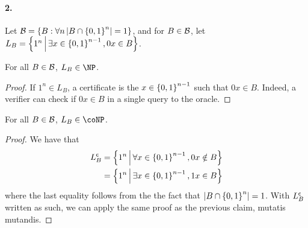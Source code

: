     \paragraph{2.}
    Let $ \mathcal B = \left\{ B : \forall n \left| B \cap \left\{ 0, 1 \right\}^n \right| = 1 \right\} $,
    and for $B \in \mathcal B$, let $
        L_B = \left\{ 1^n \, \middle| \,  \exists x \in \left\{ 0, 1 \right\}^{n-1}, 0x \in B \right\}
    $.

    \begin{claim}
        For all $B \in \mathcal B$, $L_B \in \NP$.
    \end{claim}
    \begin{proof}
        If $1^n \in L_B$, a certificate is the $x \in \left\{ 0, 1 \right\}^{n-1}$
        such that $0x \in B$. Indeed, a verifier can check if $0x \in B$ in a 
        single query to the oracle.
    \end{proof}


    \begin{claim}
        For all $B \in \mathcal B$, $L_B \in \coNP$.
    \end{claim}
    \begin{proof}
        We have that \begin{align*}
            L_B^\mathsf{c} &=
            \left\{ 1^n \, \middle| \,  
                \forall x \in \left\{ 0, 1 \right\}^{n-1}, 0x \notin B
             \right\}
            \\&=
            \left\{ 1^n \, \middle| \,  
                \exists x \in \left\{ 0, 1 \right\}^{n-1}, 1x \in B
             \right\}
        \end{align*}
        where the last equality follows from the the fact that
        $\left| B \cap \left\{ 0, 1 \right\}^n \right| = 1$.
        With $L_B^\mathsf{c}$ written as such, we can apply the same proof as the previous
        claim, mutatis mutandis.
    \end{proof}

